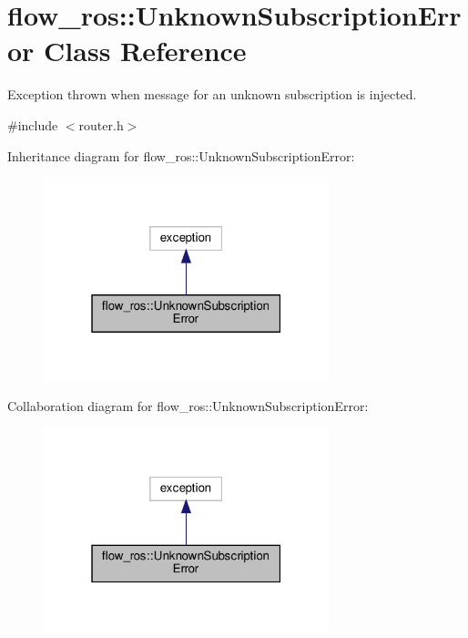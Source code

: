 \hypertarget{classflow__ros_1_1_unknown_subscription_error}{}\section{flow\+\_\+ros\+:\+:Unknown\+Subscription\+Error Class Reference}
\label{classflow__ros_1_1_unknown_subscription_error}


Exception thrown when message for an unknown subscription is injected.  




{\ttfamily \#include $<$router.\+h$>$}



Inheritance diagram for flow\+\_\+ros\+:\+:Unknown\+Subscription\+Error\+:\nopagebreak
\begin{figure}[H]
\begin{center}
\leavevmode
\includegraphics[width=235pt]{classflow__ros_1_1_unknown_subscription_error__inherit__graph}
\end{center}
\end{figure}


Collaboration diagram for flow\+\_\+ros\+:\+:Unknown\+Subscription\+Error\+:\nopagebreak
\begin{figure}[H]
\begin{center}
\leavevmode
\includegraphics[width=235pt]{classflow__ros_1_1_unknown_subscription_error__coll__graph}
\end{center}
\end{figure}
